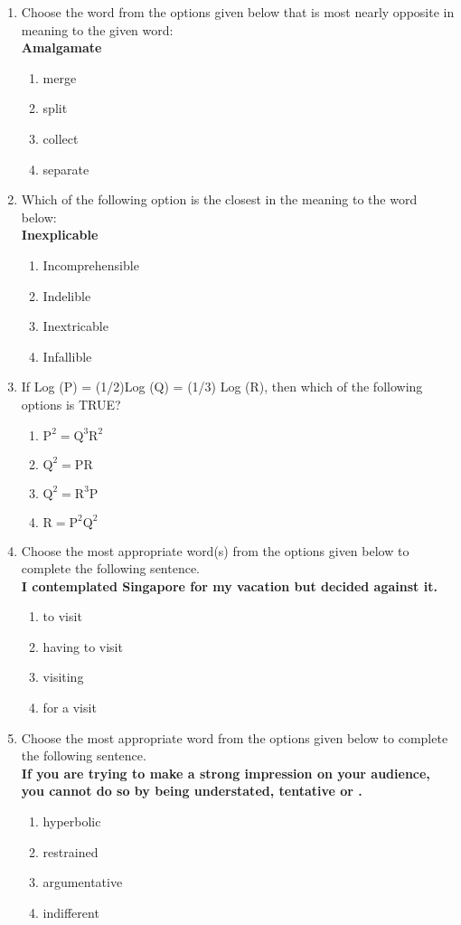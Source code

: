 \documentclass[journal,12pt,onecolumn]{IEEEtran}
\theoremstyle{remark}
\begin{document}
\begin{enumerate} [start=53]
\subsection*{\textbf{Q.56-Q.60 carry one mark each.}}
\item Choose the word from the options given below that is most nearly opposite in meaning to the given word:\\ \textbf{Amalgamate} 
\begin{enumerate}
    \item merge
    \item split
    \item collect
    \item separate
\end{enumerate}
\item Which of the following option is the closest in the meaning to the word below: \\ \textbf{Inexplicable}
\begin{enumerate}
    \item Incomprehensible
    \item Indelible
    \item Inextricable
    \item Infallible
\end{enumerate}
\item If Log (P) = (1/2)Log (Q) = (1/3) Log (R), then which of the following options is TRUE?
\begin{enumerate}
    \item $\text{P}^2=\text{Q}^3\text{R}^2$
    \item $\text{Q}^2=\text{PR}$
    \item $\text{Q}^2=\text{R}^3\text{P}$
    \item $\text{R}=\text{P}^2\text{Q}^2$
\end{enumerate}
\item Choose the most appropriate word(s) from the options given below to complete the following sentence.\\
\textbf{I contemplated \underline{\hspace{3cm}} Singapore for my vacation but decided against it.}
\begin{enumerate}
    \item to visit
    \item having to visit
    \item visiting
    \item for a visit
\end{enumerate}
\item Choose the most appropriate word from the options given below to complete the following sentence. \\
\textbf{If you are trying to make a strong impression on your audience, you cannot do so by being understated, tentative or \underline{\hspace{3cm}}.}
\begin{enumerate}
    \item hyperbolic
    \item restrained
    \item argumentative
    \item indifferent
\end{enumerate}

\end{enumerate}
\end{document}
